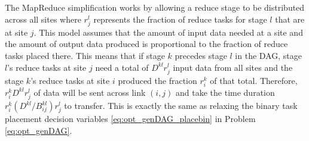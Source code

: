 The MapReduce simplification works by allowing a reduce stage to be distributed across all sites where $r^l_j$ represents the fraction of reduce tasks for stage $l$ that are at site $j$.
This model assumes that the amount of input data needed at a site and the amount of output data produced is proportional to the fraction of reduce tasks placed there.
This means that if stage $k$ precedes stage $l$ in the DAG, stage $l$'s reduce tasks at site $j$ need a total of $D^{kl}r_j^l$ input data from all sites and the stage $k$'s reduce tasks at site $i$ produced the fraction $r_i^k$ of that total.
Therefore, $r_i^kD^{kl}r_j^l$ of data will be sent across link $(i,j)$ and take the time duration $r_i^k(D^{kl}/B_{ij}^{kl})r_j^l$ to transfer.
This is exactly the same as relaxing the binary task placement decision variables \eqref{eq:opt_genDAG_placebin} in Problem \eqref{eq:opt_genDAG}.
